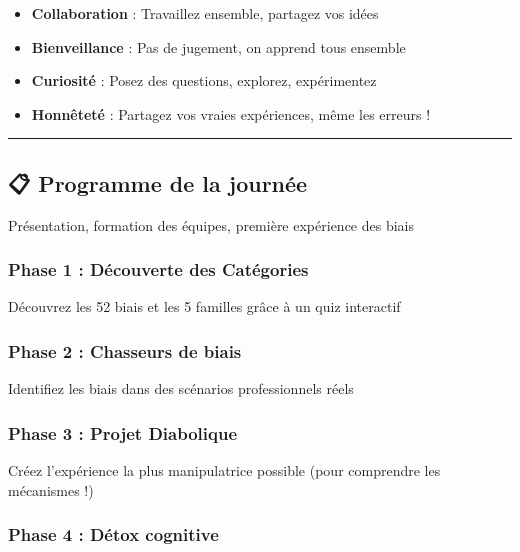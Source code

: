 \documentclass[
]{article}
\providecommand{\tightlist}{%
  \setlength{\itemsep}{0pt}\setlength{\parskip}{0pt}}
\begin{document}
\begin{itemize}
\tightlist
\item
  \textbf{Collaboration} : Travaillez ensemble, partagez vos idées
\item
  \textbf{Bienveillance} : Pas de jugement, on apprend tous ensemble
\item
  \textbf{Curiosité} : Posez des questions, explorez, expérimentez
\item
  \textbf{Honnêteté} : Partagez vos vraies expériences, même les erreurs
  !
\end{itemize}

\begin{center}\rule{0.5\linewidth}{0.5pt}\end{center}

\subsection{📋 Programme de la
journée}\label{programme-de-la-journuxe9e}

Présentation, formation des équipes, première expérience des biais

\subsubsection{\texorpdfstring{\textbf{Phase 1 : Découverte des
Catégories}}{Phase 1 : Découverte des Catégories}}\label{phase-1-duxe9couverte-des-catuxe9gories}

Découvrez les 52 biais et les 5 familles grâce à un quiz interactif

\subsubsection{\texorpdfstring{\textbf{Phase 2 : Chasseurs de
biais}}{Phase 2 : Chasseurs de biais}}\label{phase-2-chasseurs-de-biais}

Identifiez les biais dans des scénarios professionnels réels

\subsubsection{\texorpdfstring{\textbf{Phase 3 : Projet
Diabolique}}{Phase 3 : Projet Diabolique}}\label{phase-3-projet-diabolique}

Créez l'expérience la plus manipulatrice possible (pour comprendre les
mécanismes !)

\subsubsection{\texorpdfstring{\textbf{Phase 4 : Détox
cognitive}}{Phase 4 : Détox cognitive}}\label{phase-4-duxe9tox-cognitive}
\end{document}
